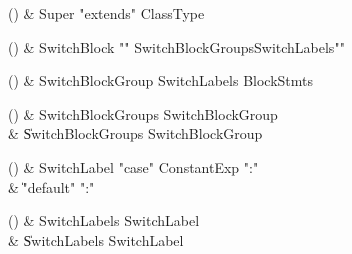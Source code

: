\begin{bbgrammarappendix}

() & Super \label{prod:Super}  \: \xcd"extends" ClassType  \\


\end{bbgrammarappendix}

\begin{bbgrammarappendix}

() & SwitchBlock \label{prod:SwitchBlock}  \: \xcd"{" SwitchBlockGroups\opt SwitchLabels\opt \xcd"}"  \\


\end{bbgrammarappendix}

\begin{bbgrammarappendix}

() & SwitchBlockGroup \label{prod:SwitchBlockGroup}  \: SwitchLabels BlockStmts  \\


\end{bbgrammarappendix}

\begin{bbgrammarappendix}

() & SwitchBlockGroups \label{prod:SwitchBlockGroups}  \: SwitchBlockGroup  \\

 &    \| SwitchBlockGroups SwitchBlockGroup \\

\end{bbgrammarappendix}

\begin{bbgrammarappendix}

() & SwitchLabel \label{prod:SwitchLabel}  \: \xcd"case" ConstantExp \xcd":"  \\

 &    \| \xcd"default" \xcd":" \\

\end{bbgrammarappendix}

\begin{bbgrammarappendix}

() & SwitchLabels \label{prod:SwitchLabels}  \: SwitchLabel  \\

 &    \| SwitchLabels SwitchLabel \\

\end{bbgrammarappendix}

